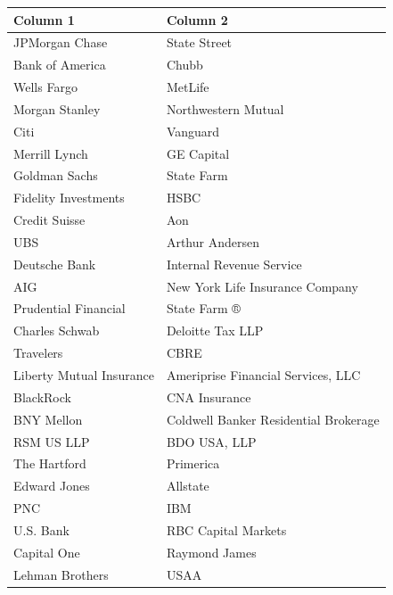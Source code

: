 
\centering
\begin{tabular}{p{7cm}p{7cm}}
\toprule
Column 1 & Column 2 \\
\midrule
JPMorgan Chase & State Street \\
Bank of America & Chubb \\
Wells Fargo & MetLife \\
Morgan Stanley & Northwestern Mutual \\
Citi & Vanguard \\
Merrill Lynch & GE Capital \\
Goldman Sachs & State Farm \\
Fidelity Investments & HSBC \\
Credit Suisse & Aon \\
UBS & Arthur Andersen \\
Deutsche Bank & Internal Revenue Service \\
AIG & New York Life Insurance Company \\
Prudential Financial & State Farm ® \\
Charles Schwab & Deloitte Tax LLP \\
Travelers & CBRE \\
Liberty Mutual Insurance & Ameriprise Financial Services, LLC \\
BlackRock & CNA Insurance \\
BNY Mellon & Coldwell Banker Residential Brokerage \\
RSM US LLP & BDO USA, LLP \\
The Hartford & Primerica \\
Edward Jones & Allstate \\
PNC & IBM \\
U.S. Bank & RBC Capital Markets \\
Capital One & Raymond James \\
Lehman Brothers & USAA \\

\bottomrule
\end{tabular}
